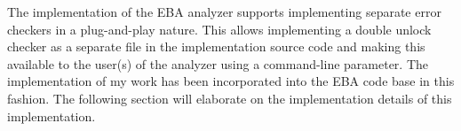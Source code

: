 \newpar The implementation of the EBA analyzer supports implementing separate error checkers in a plug-and-play nature. This allows implementing a double unlock checker as a separate file in the implementation source code and making this available to the user(s) of the analyzer using a command-line parameter. The implementation of my work has been incorporated into the EBA code base in this fashion. The following section will elaborate on the implementation details of this implementation. 